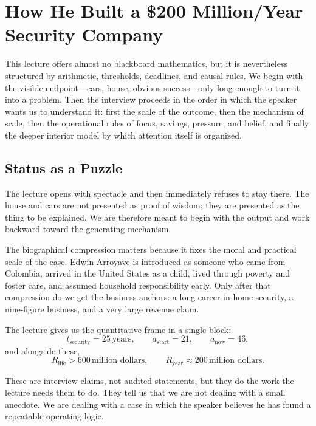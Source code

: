 \chapter{How He Built a \$200 Million/Year Security Company}

This lecture offers almost no blackboard mathematics, but it is nevertheless structured by arithmetic, thresholds, deadlines, and causal rules. We begin with the visible endpoint---cars, house, obvious success---only long enough to turn it into a problem. Then the interview proceeds in the order in which the speaker wants us to understand it: first the scale of the outcome, then the mechanism of scale, then the operational rules of focus, savings, pressure, and belief, and finally the deeper interior model by which attention itself is organized.

\section{Status as a Puzzle}

The lecture opens with spectacle and then immediately refuses to stay there. The house and cars are not presented as proof of wisdom; they are presented as the thing to be explained. We are therefore meant to begin with the output and work backward toward the generating mechanism.

The biographical compression matters because it fixes the moral and practical scale of the case. Edwin Arroyave is introduced as someone who came from Colombia, arrived in the United States as a child, lived through poverty and foster care, and assumed household responsibility early. Only after that compression do we get the business anchors: a long career in home security, a nine-figure business, and a very large revenue claim.

The lecture gives us the quantitative frame in a single block:
\begin{equation}
t_{\mathrm{security}} = 25\ \text{years},\qquad
a_{\mathrm{start}} = 21,\qquad
a_{\mathrm{now}} = 46,
\end{equation}
and alongside these,
\begin{equation}
R_{\mathrm{life}} > 600\,\text{million dollars},\qquad
R_{\mathrm{year}} \approx 200\,\text{million dollars}.
\end{equation}

These are interview claims, not audited statements, but they do the work the lecture needs them to do. They tell us that we are not dealing with a small anecdote. We are dealing with a case in which the speaker believes he has found a repeatable operating logic.

